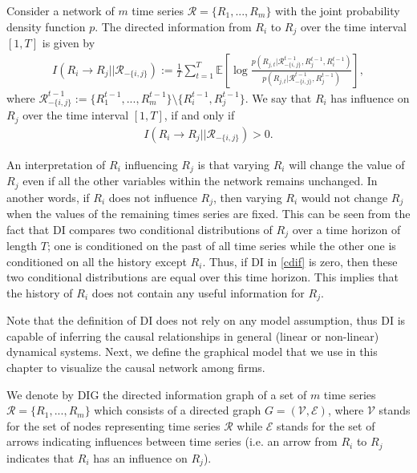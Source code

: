 \clearpage

 \begin{definition}\label{cdi}
Consider a network of $m$ time series $\mathcal{R}=\{R_1,...,R_m\}$ with the joint probability density function $p$. The directed information from $R_i$ to $R_j$ over the time interval $[1,T]$ is given by
\begin{align}\label{cdif}
I(R_i\rightarrow R_j||\mathcal{R}_{-\{i,j\}}):=\frac{1}{T}\sum_{t=1}^T\mathbb{E}\left[\log\frac{p(R_{j,t}|\mathcal{R}^{t-1}_{-\{i,j\}},R_{j}^{t-1},R_{i}^{t-1})}{p(R_{j,t}|\mathcal{R}^{t-1}_{-\{i,j\}},R_{j}^{t-1})}\right],
\end{align}
where $\mathcal{R}_{-\{i,j\}}^{t-1}\!:=\!\{R_{1}^{t-1},...,R_{m}^{t-1}\}\!\setminus\!\{R_{i}^{t-1},R_{j}^{t-1}\}$.
We say that $R_i$ has influence on $R_j$ over the time interval $[1,T]$, if and only if
\begin{align}\label{cdif1}
I(R_i\rightarrow R_j||\mathcal{R}_{-\{i,j\}})>0.
\end{align}
 \end{definition}
 
An interpretation of $R_i$ influencing $R_j$ is that varying $R_i$ will change the value of $R_j$ even if all the other variables within the network remains unchanged. 
 In another words, if $R_i$ does not influence $R_j$, then varying $R_i$ would not change $R_j$ when the values of the remaining times series are fixed. 
 This can be seen from the fact that DI compares two conditional distributions of $R_j$ over a time horizon of length $T$; one is conditioned on the past of all time series while the other one is conditioned on all the history except $R_i$. Thus, if DI in \eqref{cdif} is zero, then these two conditional distributions are equal over this time horizon. This implies that the history of $R_i$ does not contain any useful information for $R_j$.  
 
 
Note that the definition of DI does not rely on any model assumption, thus DI is capable of inferring the causal relationships in general (linear or non-linear) dynamical systems. Next, we define the graphical model that we use in this chapter to visualize the causal network among firms.


\begin{definition}\label{DIG1}
We denote by DIG the directed information graph of a set of $m$ time series $\mathcal{R}=\{R_1,...,R_m\}$ which consists of a directed graph $G=(\mathcal{V},\mathcal{E})$, where $\mathcal{V}$ stands for the set of nodes representing time series $\mathcal{R}$ while $\mathcal{E}$ stands for the set of arrows indicating influences between time series (i.e. an arrow from $R_i$ to  $R_j$ indicates that $R_i$ has an influence on $R_j$). 
\end{definition} 

